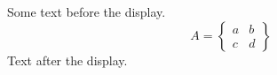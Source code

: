 \documentclass[12pt]{article}
\begin{document}
Some text before the display.
\[ A = \begin{Bmatrix} a & b \\ c & d \end{Bmatrix} \]
Text after the display.
\end{document}
